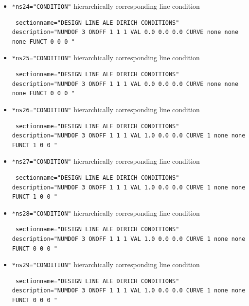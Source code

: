 \begin{itemize}
 \item \verb|*ns24="CONDITION"| \qquad hierarchically corresponding line condition
\begin{small} \begin{verbatim} sectionname="DESIGN LINE ALE DIRICH CONDITIONS"
description="NUMDOF 3 ONOFF 1 1 1 VAL 0.0 0.0 0.0 CURVE none none none FUNCT 0 0 0 "
\end{verbatim} \end{small} 

\item \verb|*ns25="CONDITION"| \qquad hierarchically corresponding line condition
\begin{small} \begin{verbatim} sectionname="DESIGN LINE ALE DIRICH CONDITIONS"
description="NUMDOF 3 ONOFF 1 1 1 VAL 0.0 0.0 0.0 CURVE none none none FUNCT 0 0 0 "
\end{verbatim} \end{small}

 \item \verb|*ns26="CONDITION"| \qquad hierarchically corresponding line condition
\begin{small} \begin{verbatim} sectionname="DESIGN LINE ALE DIRICH CONDITIONS"
description="NUMDOF 3 ONOFF 1 1 1 VAL 1.0 0.0 0.0 CURVE 1 none none FUNCT 1 0 0 "
\end{verbatim} \end{small}

 \item \verb|*ns27="CONDITION"| \qquad hierarchically corresponding line condition
\begin{small} \begin{verbatim} sectionname="DESIGN LINE ALE DIRICH CONDITIONS"
description="NUMDOF 3 ONOFF 1 1 1 VAL 1.0 0.0 0.0 CURVE 1 none none FUNCT 1 0 0 "
\end{verbatim} \end{small}

 \item \verb|*ns28="CONDITION"| \qquad hierarchically corresponding line condition
\begin{small} \begin{verbatim} sectionname="DESIGN LINE ALE DIRICH CONDITIONS"
description="NUMDOF 3 ONOFF 1 1 1 VAL 1.0 0.0 0.0 CURVE 1 none none FUNCT 0 0 0 "
\end{verbatim} \end{small}

 \item \verb|*ns29="CONDITION"| \qquad hierarchically corresponding line condition
\begin{small} \begin{verbatim} sectionname="DESIGN LINE ALE DIRICH CONDITIONS"
description="NUMDOF 3 ONOFF 1 1 1 VAL 1.0 0.0 0.0 CURVE 1 none none FUNCT 0 0 0 "
\end{verbatim} \end{small}


\end{itemize}
